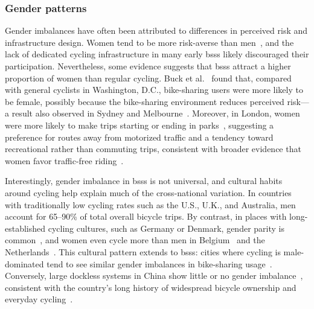    \subsubsection{Gender patterns }


    Gender imbalances have often been attributed to differences in perceived risk and infrastructure design. Women tend to be more risk-averse than men~\cite{Garrard2008, Garrard2012}, and the lack of dedicated cycling infrastructure in many early \acp{bss} likely discouraged their participation. Nevertheless, some evidence suggests that \acp{bss} attract a higher proportion of women than regular cycling. Buck et al.~\cite{Buck2013} found that, compared with general cyclists in Washington, D.C., bike-sharing  users were more likely to be female, possibly because the bike-sharing environment reduces perceived risk—a result also observed in Sydney and Melbourne~\cite{Pucher2011}. Moreover, in London, women were more likely to make trips starting or ending in parks~\cite{Goodman2014}, suggesting a preference for routes away from motorized traffic and a tendency toward recreational rather than commuting trips, consistent with broader evidence that women favor traffic-free riding~\cite{Johnson2010}.

    Interestingly, gender imbalance in \acp{bss} is not universal, and cultural habits around cycling help explain much of the cross-national variation. In countries with traditionally low cycling rates such as the U.S., U.K., and Australia, men account for 65–90\% of total overall bicycle trips. By contrast, in places with long-established cycling cultures, such as Germany or Denmark, gender parity is common~\cite{Pucher2008}, and women even cycle more than men in Belgium~\cite{Witlox2004} and the Netherlands~\cite{Harms2014}. This cultural pattern extends to \acp{bss}: cities where cycling is male-dominated tend to see similar gender imbalances in bike-sharing usage~\cite{Fishman2016, Willberg2021}. Conversely, large dockless systems in China show little or no gender imbalance~\cite{Chen2020_exploring}, consistent with the country’s long history of widespread bicycle ownership and everyday cycling~\cite{Zhang2015}.

